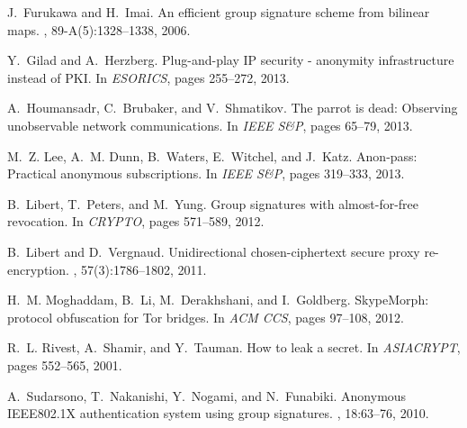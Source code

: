 \documentclass[preprint]{sig-alternate}
\begin{document}
\begin{thebibliography}{10}
\bibitem{[FurukawaI06]}
J.~Furukawa and H.~Imai.
\newblock An efficient group signature scheme from bilinear maps.
, 89-A(5):1328--1338, 2006.

\bibitem{[GiladH13]}
Y.~Gilad and A.~Herzberg.
\newblock Plug-and-play {IP} security - anonymity infrastructure instead of
  {PKI}.
\newblock In {\em ESORICS}, pages 255--272, 2013.

A.~Houmansadr, C.~Brubaker, and V.~Shmatikov.
\newblock The parrot is dead: Observing unobservable network communications.
\newblock In {\em IEEE S\&P}, pages 65--79, 2013.

M.~Z. Lee, A.~M. Dunn, B.~Waters, E.~Witchel, and J.~Katz.
\newblock Anon-pass: Practical anonymous subscriptions.
\newblock In {\em IEEE S\&P}, pages 319--333, 2013.

\bibitem{[LibertPY12]}
B.~Libert, T.~Peters, and M.~Yung.
\newblock Group signatures with almost-for-free revocation.
\newblock In {\em CRYPTO}, pages 571--589, 2012.

\bibitem{[LibertV11]}
B.~Libert and D.~Vergnaud.
\newblock Unidirectional chosen-ciphertext secure proxy re-encryption.
, 57(3):1786--1802, 2011.

\bibitem{[MoghaddamLDG12]}
H.~M. Moghaddam, B.~Li, M.~Derakhshani, and I.~Goldberg.
\newblock Skype{M}orph: protocol obfuscation for {T}or bridges.
\newblock In {\em ACM CCS}, pages 97--108, 2012.

\bibitem{[RivestST01]}
R.~L. Rivest, A.~Shamir, and Y.~Tauman.
\newblock How to leak a secret.
\newblock In {\em ASIACRYPT}, pages 552--565, 2001.

\bibitem{[SudarsonoNNF10]}
A.~Sudarsono, T.~Nakanishi, Y.~Nogami, and N.~Funabiki.
\newblock Anonymous {IEEE}802.1{X} authentication system using group
  signatures.
, 18:63--76, 2010.

\end{thebibliography}
\end{document}
